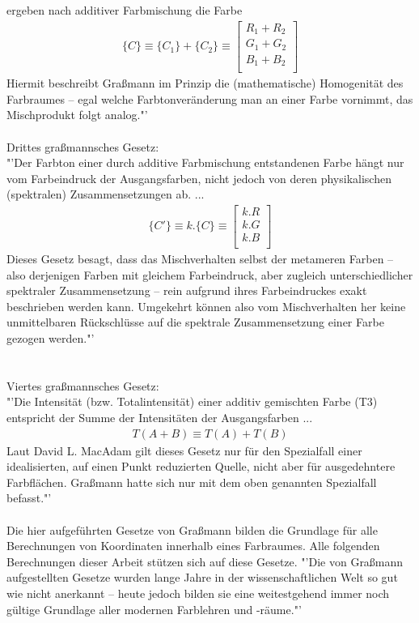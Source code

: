 \documentclass[11pt]{scrartcl}
\begin{document}
ergeben nach additiver Farbmischung die Farbe
\begin{align}\label{Equ:4}
    \{C\} \equiv \{C_1\} +\{C_2\} \equiv \left[ \begin{array}{r}
        R_1 + R_2 \\
        G_1 + G_2 \\
        B_1 + B_2 \\
    \end{array}\right]
\end{align}
Hiermit beschreibt Graßmann im Prinzip die (mathematische) Homogenität des Farbraumes – egal welche Farbtonveränderung man an einer Farbe
vornimmt, das Mischprodukt folgt analog."'\cite{wikipediaGrassmannGestze}\\
\\
Drittes graßmannsches Gesetz:\\
"'Der Farbton einer durch additive Farbmischung entstandenen Farbe hängt nur vom Farbeindruck der Ausgangsfarben, nicht jedoch von deren
physikalischen (spektralen) Zusammensetzungen ab. ...
\begin{align}\label{Equ:5}
    \{C'\} \equiv k.\{C\} \equiv \left[ \begin{array}{r}
        k.R \\
        k.G \\
        k.B \\
    \end{array}\right]
\end{align}
Dieses Gesetz besagt, dass das Mischverhalten selbst der metameren Farben – also derjenigen Farben mit gleichem Farbeindruck, aber
zugleich unterschiedlicher spektraler Zusammensetzung – rein aufgrund ihres Farbeindruckes exakt beschrieben werden kann. Umgekehrt können
also vom Mischverhalten her keine unmittelbaren Rückschlüsse auf die spektrale Zusammensetzung einer Farbe gezogen werden."'\\
\cite{wikipediaGrassmannGestze}\\
\\
Viertes graßmannsches Gesetz:\\
"'Die Intensität (bzw. Totalintensität) einer additiv gemischten Farbe (T3) entspricht der Summe der Intensitäten der Ausgangsfarben ...
\begin{align}\label{Equ:6}
    T(A+B) \equiv T(A) + T(B)
\end{align}
Laut David L. MacAdam gilt dieses Gesetz nur für den Spezialfall einer idealisierten, auf einen Punkt reduzierten Quelle, nicht aber für
ausgedehntere Farbflächen. Graßmann hatte sich nur mit dem oben genannten Spezialfall befasst."' \cite{wikipediaGrassmannGestze}\\
\\
Die hier aufgeführten Gesetze von Graßmann bilden die Grundlage für alle Berechnungen von Koordinaten innerhalb eines Farbraumes. Alle folgenden
Berechnungen dieser Arbeit stützen sich auf diese Gesetze. "'Die von Graßmann aufgestellten Gesetze wurden lange Jahre in der wissenschaftlichen
Welt so gut wie nicht anerkannt – heute jedoch bilden sie eine weitestgehend immer noch gültige Grundlage aller modernen Farblehren und -räume."'\\
\cite{wikipediaGrassmannGestze}
\end{document}
